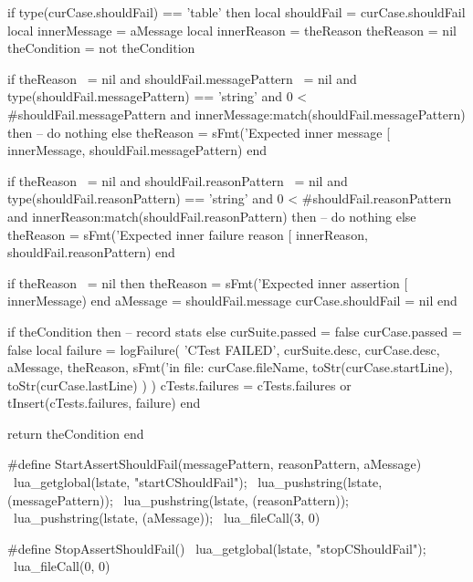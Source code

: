   if type(curCase.shouldFail) == 'table' then
    local shouldFail   = curCase.shouldFail
    local innerMessage = aMessage
    local innerReason  = theReason
    theReason          = nil
    theCondition       = not theCondition

    if theReason ~= nil
      and shouldFail.messagePattern ~= nil
      and type(shouldFail.messagePattern) == 'string'
      and 0 < #shouldFail.messagePattern
      and innerMessage:match(shouldFail.messagePattern) then
      -- do nothing
    else
      theReason = sFmt('Expected inner message [%
        innerMessage, shouldFail.messagePattern)
    end

    if theReason ~= nil
      and shouldFail.reasonPattern ~= nil
      and type(shouldFail.reasonPattern) == 'string'
      and 0 < #shouldFail.reasonPattern
      and innerReason:match(shouldFail.reasonPattern) then
      -- do nothing
    else
      theReason = sFmt('Expected inner failure reason [%
        innerReason, shouldFail.reasonPattern)
    end
    
    if theReason ~= nil then
      theReason = sFmt('Expected inner assertion [%
        innerMessage)
    end
    aMessage = shouldFail.message
    curCase.shouldFail = nil
  end
  
  if theCondition then
    -- record stats
  else
    curSuite.passed = false
    curCase.passed  = false
    local failure = logFailure(
      'CTest FAILED',
      curSuite.desc,
      curCase.desc,
      aMessage,
      theReason,
      sFmt('in file: %
        curCase.fileName,
        toStr(curCase.startLine),
        toStr(curCase.lastLine)
      )
    )
    cTests.failures = cTests.failures or { }
    tInsert(cTests.failures, failure)
  end

  return theCondition
end
\stopLuaCode


\startCHeader
#define StartAssertShouldFail(messagePattern, reasonPattern, aMessage) \
  lua_getglobal(lstate, "startCShouldFail");                           \
  lua_pushstring(lstate, (messagePattern));                            \
  lua_pushstring(lstate, (reasonPattern));                             \
  lua_pushstring(lstate, (aMessage));                                  \
  lua_fileCall(3, 0)

#define StopAssertShouldFail()              \
  lua_getglobal(lstate, "stopCShouldFail"); \
  lua_fileCall(0, 0)
\stopCHeader


